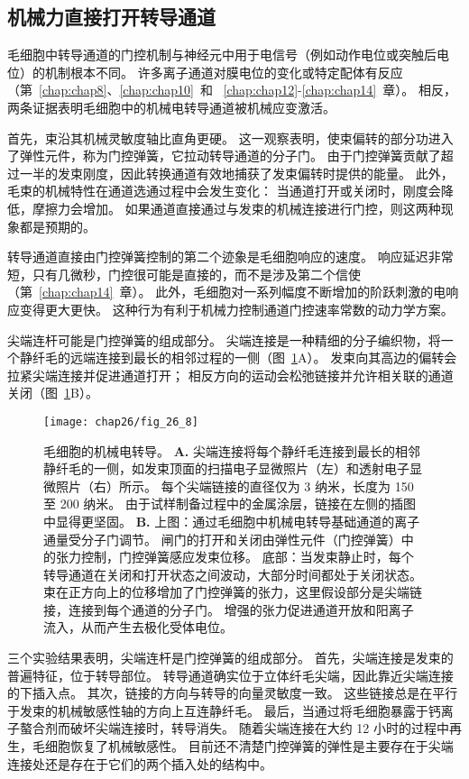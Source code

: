 \subsection{机械力直接打开转导通道}

毛细胞中转导通道的门控机制与神经元中用于电信号（例如动作电位或突触后电位）的机制根本不同。
许多离子通道对膜电位的变化或特定配体有反应（第~\ref{chap:chap8}、\ref{chap:chap10}~和 ~\ref{chap:chap12}-\ref{chap:chap14}~章）。
相反，两条证据表明毛细胞中的机械电转导通道被机械应变激活。


首先，束沿其机械灵敏度轴比直角更硬。
这一观察表明，使束偏转的部分功进入了弹性元件，称为门控弹簧，它拉动转导通道的分子门。
由于门控弹簧贡献了超过一半的发束刚度，因此转换通道有效地捕获了发束偏转时提供的能量。
此外，毛束的机械特性在通道选通过程中会发生变化：
当通道打开或关闭时，刚度会降低，摩擦力会增加。
如果通道直接通过与发束的机械连接进行门控，则这两种现象都是预期的。


转导通道直接由门控弹簧控制的第二个迹象是毛细胞响应的速度。
响应延迟非常短，只有几微秒，门控很可能是直接的，而不是涉及第二个信使（第~\ref{chap:chap14}~章）。
此外，毛细胞对一系列幅度不断增加的阶跃刺激的电响应变得更大更快。
这种行为有利于机械力控制通道门控速率常数的动力学方案。


尖端连杆可能是门控弹簧的组成部分。
尖端连接是一种精细的分子编织物，将一个静纤毛的远端连接到最长的相邻过程的一侧（图~\ref{fig:26_8}A）。
发束向其高边的偏转会拉紧尖端连接并促进通道打开； 相反方向的运动会松弛链接并允许相关联的通道关闭（图~\ref{fig:26_8}B）。


\begin{figure}[htbp]
	\centering
	\texttt{[image: chap26/fig\_26\_8]}
	\caption{毛细胞的机械电转导。
		\textbf{A.} 尖端连接将每个静纤毛连接到最长的相邻静纤毛的一侧，如发束顶面的扫描电子显微照片（左）和透射电子显微照片（右）所示。
		每个尖端链接的直径仅为 3 纳米，长度为 150 至 200 纳米。
		由于试样制备过程中的金属涂层，链接在左侧的插图中显得更坚固\cite{assad1991tip,hudspeth1994pulling}。
		\textbf{B.} 上图：通过毛细胞中机械电转导基础通道的离子通量受分子门调节。
		闸门的打开和关闭由弹性元件（门控弹簧）中的张力控制，门控弹簧感应发束位移\cite{howard1988compliance}。
		底部：当发束静止时，每个转导通道在关闭和打开状态之间波动，大部分时间都处于关闭状态。
		束在正方向上的位移增加了门控弹簧的张力，这里假设部分是尖端链接，连接到每个通道的分子门。
		增强的张力促进通道开放和阳离子流入，从而产生去极化受体电位\cite{hudspeth1989ear}。}
	\label{fig:26_8}
\end{figure}


三个实验结果表明，尖端连杆是门控弹簧的组成部分。
首先，尖端连接是发束的普遍特征，位于转导部位。
转导通道确实位于立体纤毛尖端，因此靠近尖端连接的下插入点。
其次，链接的方向与转导的向量灵敏度一致。
这些链接总是在平行于发束的机械敏感性轴的方向上互连静纤毛。
最后，当通过将毛细胞暴露于钙离子螯合剂而破坏尖端连接时，转导消失。
随着尖端连接在大约 12 小时的过程中再生，毛细胞恢复了机械敏感性。
目前还不清楚门控弹簧的弹性是主要存在于尖端连接处还是存在于它们的两个插入处的结构中。


